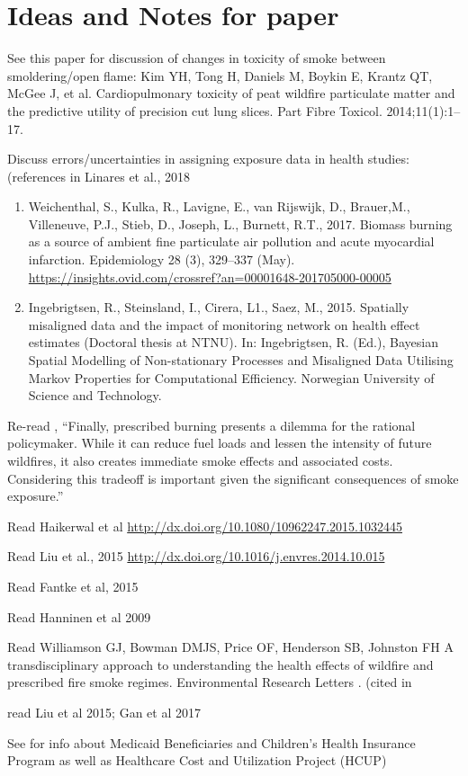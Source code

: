 \section{Ideas and Notes for paper}

See this paper for discussion of changes in toxicity of smoke between smoldering/open flame: Kim YH, Tong H, Daniels M, Boykin E, Krantz QT, McGee J, et al.
Cardiopulmonary toxicity of peat wildfire particulate matter and the predictive
utility of precision cut lung slices. Part Fibre Toxicol. 2014;11(1):1–17.

Discuss errors/uncertainties in assigning exposure data in health studies: (references in Linares et al., 2018 \cite{linares_impact_2018}
\begin{enumerate}
\item Weichenthal, S., Kulka, R., Lavigne, E., van Rijswijk, D., Brauer,M., Villeneuve, P.J., Stieb, D.,
Joseph, L., Burnett, R.T., 2017. Biomass burning as a source of ambient fine particulate
air pollution and acute myocardial infarction. Epidemiology 28 (3), 329–337 (May). \url{https://insights.ovid.com/crossref?an=00001648-201705000-00005}

\item Ingebrigtsen, R., Steinsland, I., Cirera, L1., Saez, M., 2015. Spatially misaligned data and the
impact of monitoring network on health effect estimates (Doctoral thesis at NTNU).
In: Ingebrigtsen, R. (Ed.), Bayesian Spatial Modelling of Non-stationary Processes
and Misaligned Data Utilising Markov Properties for Computational Efficiency. Norwegian
University of Science and Technology. 
\end{enumerate}

Re-read \cite{jones_application_2017}, ``Finally, prescribed burning presents a dilemma for the rational policymaker. While it can reduce fuel loads and lessen the intensity of future wildfires, it also creates immediate smoke effects and associated costs. Considering this tradeoff is important given the significant consequences of smoke exposure.''

Read Haikerwal et al \url{http://dx.doi.org/10.1080/10962247.2015.1032445}

Read Liu et al., 2015 \url{http://dx.doi.org/10.1016/j.envres.2014.10.015}

Read Fantke et al, 2015 \cite{http://dx.doi.org/10.1007/s11367-014-0822-2}

Read Hanninen et al 2009 \cite{http://dx.doi.org/10.1038/jes.2008.31}

Read Williamson GJ, Bowman DMJS, Price OF, Henderson SB, Johnston FH \cite{williamson_transdisciplinary_2016} A transdisciplinary approach to understanding the health effects of wildfire and prescribed fire smoke regimes. Environmental Research Letters . (cited in \cite{hyde_air_2017}

read Liu et al 2015; Gan et al 2017

See \cite{vaidyanathan_developing_2018} for info about Medicaid Beneficiaries and Children's Health Insurance Program as well as Healthcare Cost and Utilization Project (HCUP)